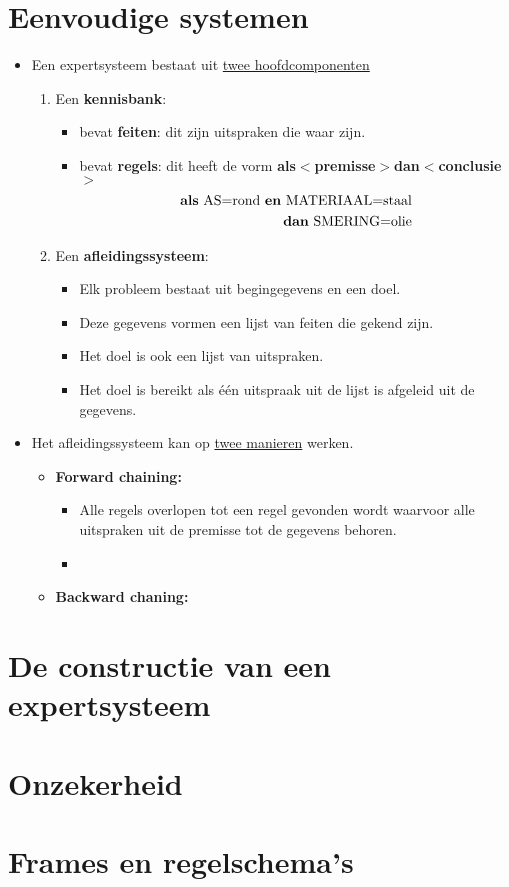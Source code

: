 \section{Eenvoudige systemen}
\begin{itemize}
	\item Een expertsysteem bestaat uit \underline{twee hoofdcomponenten}
	\begin{enumerate}
		\item Een \textbf{kennisbank}:
		\begin{itemize}
			\item bevat \textbf{feiten}: dit zijn uitspraken die waar zijn.
			\item bevat \textbf{regels}: dit heeft de vorm \textbf{als$<$premisse$>$dan$<$conclusie$>$}
			\begin{equation*}
				\begin{split}
					\hbox{\textbf{als} AS=rond \textbf{en} MATERIAAL=staal} \\
					\hbox{\textbf{dan} SMERING=olie} 
				\end{split}
			\end{equation*}
		\end{itemize}
		\item Een \textbf{afleidingssysteem}:
		\begin{itemize}
			\item Elk probleem bestaat uit begingegevens en een doel.
			\item Deze gegevens vormen een lijst van feiten die gekend zijn.
			\item Het doel is ook een lijst van uitspraken.
			\item Het doel is bereikt als één uitspraak uit de lijst is afgeleid uit de gegevens.
		\end{itemize}
	\end{enumerate}
	\item Het afleidingssysteem kan op \underline{twee manieren} werken.
	\begin{itemize}
		\item \textbf{Forward chaining:}
		\begin{itemize}
			\item Alle regels overlopen tot een regel gevonden wordt waarvoor alle uitspraken uit de premisse tot de gegevens behoren.
			\item 
		\end{itemize}
		
		\item \textbf{Backward chaning:}
	\end{itemize}
\end{itemize}
\section{De constructie van een expertsysteem}

\section{Onzekerheid}

\section{Frames en regelschema's}